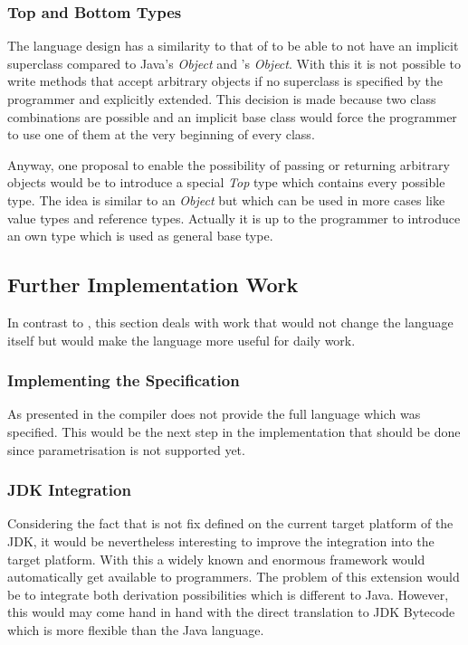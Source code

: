 \subsubsection{Top and Bottom Types}
The language design has a similarity to that of \cpp to be able to not
have an implicit superclass compared to Java's \emph{Object} and \cs's
\emph {Object}. With this it is not possible to write methods that accept
arbitrary objects if no superclass is specified by the programmer and
explicitly extended. This decision is made because two class combinations
are possible and an implicit base class would force the programmer to
use one of them at the very beginning of every class.

Anyway, one proposal to enable the possibility of passing or returning
arbitrary objects would be to introduce a special \emph{Top} type which
contains every possible type. The idea is similar to an \emph{Object}
but which can be used in more cases like value types and reference
types. Actually it is up to the programmer to introduce an own type
which is used as general base type.


\subsection{Further Implementation Work}
In contrast to , this section deals with work that
would not change the language itself but would make the language more useful
for daily work.

\subsubsection{Implementing the Specification}
As presented in  the compiler does not provide the
full language which was specified. This would be the next step in the
implementation that should be done since parametrisation is not supported
yet.

\subsubsection{JDK Integration}
Considering the fact that \ooplss is not fix defined on the current
target platform of the JDK, it would be nevertheless interesting to
improve the integration into the target platform. With this a widely
known and enormous framework would automatically get available to
\ooplss programmers. The problem of this extension would be to integrate
both derivation possibilities which is different to Java. However,
this would may come hand in hand with the direct translation to JDK
Bytecode which is more flexible than the Java language.

